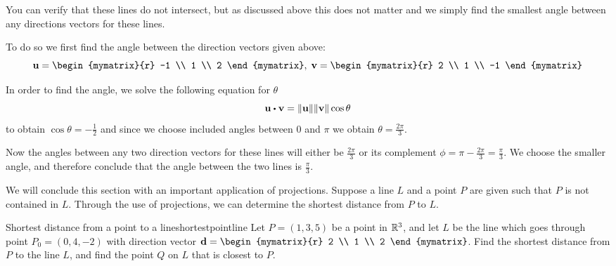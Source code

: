 \begin{solution}
You can verify that these lines do not intersect, but as discussed
above this does not matter and we simply find the smallest angle
between any directions vectors for these lines.

To do so  we first find the angle
between the direction vectors given above:
\begin{equation*}
\vect{u}=\begin{mymatrix}{r}
-1 \\
1 \\
2
\end{mymatrix},\;
\vect{v}=\begin{mymatrix}{r}
2 \\
1 \\
-1
\end{mymatrix}
\end{equation*}

In order to find the angle, we solve the following equation for $\theta$
\begin{equation*}
\vect{u}\dotprod \vect{v}=\norm{\vect{u}} \norm{\vect{v}
} \cos \theta
\end{equation*}
to obtain $\cos \theta = -\frac{1}{2}$ and since we choose included
angles between $0$ and $\pi$ we obtain $\theta = \frac{2 \pi}{3}$.


Now the angles between any two direction vectors for these lines will
either be $\frac{2 \pi}{3}$ or its complement $ \phi = \pi -  \frac{2 \pi}{3}
= \frac{\pi}{3}$. We choose the smaller angle, and therefore conclude that the angle between the two lines is $\frac{\pi}{3}$.
\end{solution}


We will conclude this section with an important application of projections. Suppose a line $L$ and a point $P$ are given such that $P$ is not contained in $L$. Through the use of projections, we can determine the shortest distance from $P$ to $L$. 

\begin{example}{Shortest distance from a point to a line}{shortestpointline}
Let $P = (1,3,5)$ be a point in $\mathbb{R}^3$, and let $L$ be the line which goes through point $P_0 = (0,4,-2)$ with direction vector $\vect{d} = \begin{mymatrix}{r}
2 \\
1 \\
2
\end{mymatrix}
$.  Find the shortest distance from $P$ to the line $L$, and find the point $Q$ on $L$ that is closest to $P$. 
\end{example}

